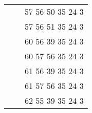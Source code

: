 \begin{tabular}[t]{|c|c|c|}
                        &                     & 57 56 50 35 24 3      \\ \cline{3-3}
                        &                     & 57 56 51 35 24 3      \\ \cline{3-3}
                        &                     & 60 56 39 35 24 3      \\ \cline{3-3}
                        &                     & 60 57 56 35 24 3      \\ \cline{3-3}
                        &                     & 61 56 39 35 24 3      \\ \cline{3-3}
                        &                     & 61 57 56 35 24 3      \\ \cline{3-3}
                        &                     & 62 55 39 35 24 3      \\ \hline
  \end{tabular}
